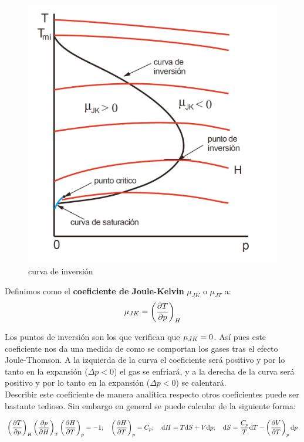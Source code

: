 \documentclass[12pt,a4paper,oneside]{book}
\begin{document}
\begin{figure}[h!] \centering
\includegraphics[scale=0.3]{isoentalpicas.png}
\caption{curva de inversión}
\end{figure}


Definimos como el \textbf{coeficiente de Joule-Kelvin} $\mu_{JK}$ o $\mu_{JT}$ a:
\begin{equation}
\mu_{JK} = \left( \frac{\partial T}{\partial p} \right)_H
\end{equation}


Los puntos de inversión son los que verifican que $\mu_{JK} = 0$. Así pues este coeficiente nos da una medida de como se comportan los gases tras el efecto Joule-Thomson. A la izquierda de la curva el coeficiente será positivo y por lo tanto en la expansión ($\Delta p <0$) el gas se enfriará, y a la derecha de la curva será positivo y por lo tanto en la expansión ($\Delta p < 0$) se calentará. \\

Describir este coeficiente de manera analítica respecto otros coeficientes puede ser bastante tedioso. Sin embargo en general se puede calcular de la siguiente forma:

$$ \left( \frac{\partial T}{\partial p} \right)_H \left( \frac{\partial p}{\partial H} \right)_T \left( \frac{\partial H}{\partial T} \right)_p=-1; \quad \left( \frac{\partial H}{\partial T} \right)_p =C_p; \quad \mathrm{d} H = T \mathrm{d} S + V \mathrm{d} p; \quad \mathrm{d} S = \dfrac{C_p}{T} \mathrm{d} T - \left( \frac{\partial V}{\partial T} \right)_p \mathrm{d} p $$
\end{document}

